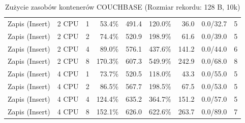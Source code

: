 \begin{table}[ht]
{\begin{tabular}{llcrrrrcc}
Zapis (Insert) & 2 CPU & 1 & 53.4\% & 491.4 & 120.0\% & 36.0 & 0.0/32.7 & 5 \\
Zapis (Insert) & 2 CPU & 2 & 74.4\% & 520.9 & 198.9\% & 61.6 & 0.0/39.0 & 5 \\
Zapis (Insert) & 2 CPU & 4 & 89.0\% & 576.1 & 437.6\% & 141.2 & 0.0/44.0 & 6 \\
Zapis (Insert) & 2 CPU & 8 & 170.3\% & 607.3 & 549.9\% & 242.9 & 0.0/68.0 & 8 \\
Zapis (Insert) & 4 CPU & 1 & 73.7\% & 520.5 & 118.0\% & 43.3 & 0.0/55.0 & 5 \\
Zapis (Insert) & 4 CPU & 2 & 86.5\% & 567.7 & 198.5\% & 67.5 & 0.0/53.0 & 5 \\
Zapis (Insert) & 4 CPU & 4 & 124.4\% & 635.2 & 364.7\% & 151.2 & 0.0/57.0 & 5 \\
Zapis (Insert) & 4 CPU & 8 & 152.1\% & 626.0 & 622.6\% & 263.7 & 0.0/89.0 & 7 \\
\bottomrule
\end{tabular}%
}
\caption{Zużycie zasobów kontenerów COUCHBASE (Rozmiar rekordu: 128 B, 10k)}
\label{tab:resources_couchbase_small_10000}
\end{table}

